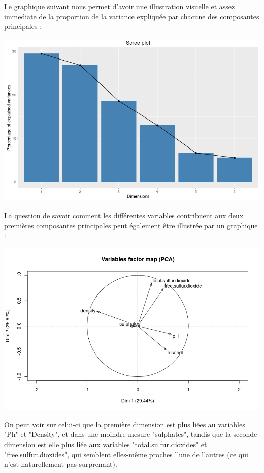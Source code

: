 \documentclass[11pt,a4paper]{article}
\begin{document}
Le graphique suivant nous permet d'avoir une illustration visuelle et assez immediate de la proportion de la variance expliquée par chacune des composantes principales :

\begin{center}
\includegraphics[scale=0.4]{"screeplot"}
\end{center}

La question de savoir comment les différentes variables contribuent aux deux premières composantes principales peut également être illustrée par un graphique :

\begin{center}
\includegraphics[scale=0.5]{"factormap"}
\end{center}

On peut voir sur celui-ci que la première dimension est plus liées au variables "Ph" et "Density", et dans une moindre mesure "sulphates", tandis que la seconde dimension est elle plus liée aux variables "total.sulfur.dioxides" et "free.sulfur.dioxides", qui semblent elles-même proches l'une de l'autres (ce qui n'est naturellement pas surprenant).
\end{document}
